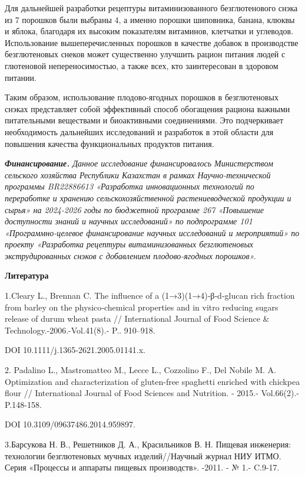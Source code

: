 {Для дальнейшей разработки рецептуры витаминизованного безглютенового
снэка из 7 порошков были выбраны 4, а именно порошки шиповника, банана,
клюквы и яблока, благодаря их высоким показателям витаминов, клетчатки и
углеводов. Использование вышеперечисленных порошков в качестве добавок в
производстве безглютеновых снеков может существенно улучшить рацион
питания людей с глютеновой непереносимостью, а также всех, кто
заинтересован в здоровом питании.

Таким образом, использование плодово-ягодных порошков в безглютеновых
снэках представляет собой эффективный способ обогащения рациона важными
питательными веществами и биоактивными соединениями. Это подчеркивает
необходимость дальнейших исследований и разработок в этой области для
повышения качества функциональных продуктов питания.

\emph{{\bfseries Финансирование.} Данное исследование финансировалось
Министерством сельского хозяйства Республики Казахстан в рамках
Научно-технической программы BR22886613 «Разработка инновационных
технологий по переработке и хранению сельскохозяйственной
растениеводческой продукции и сырья» на 2024-2026 годы по бюджетной
программе 267 «Повышение доступности знаний и научных исследований» по
подпрограмме 101 «Программно-целевое финансирование научных исследований
и мероприятий» по проекту «Разработка рецептуры витаминизованных
безглютеновых экструдированных снэков с добавлением плодово-ягодных
порошков».}

{\bfseries Литература}

1.Cleary L., Brennan C. The influence of a (1→3)(1→4)‐β‐d‐glucan rich
fraction from barley on the physico‐chemical properties and in vitro
reducing sugars release of durum wheat pasta // International Journal of
Food Science \& Technology.-2006.-Vol.41(8).- P.. 910--918.

DOI 10.1111/j.1365-2621.2005.01141.x.

2. Padalino L., Mastromatteo M., Lecce L., Cozzolino F., Del Nobile M.
A. Optimization and characterization of gluten-free spaghetti enriched
with chickpea flour // International Journal of Food Sciences and
Nutrition. - 2015.- Vol.66(2).- P.148-158.

DOI 10.3109/09637486.2014.959897.

3.Барсукова Н. В., Решетников Д. А., Красильников В. Н. Пищевая
инженерия: технологии безглютеновых мучных изделий//Научный журнал НИУ
ИТМО. Серия «Процессы и аппараты пищевых производств». -2011. - № 1.-
C.9-17.

}
